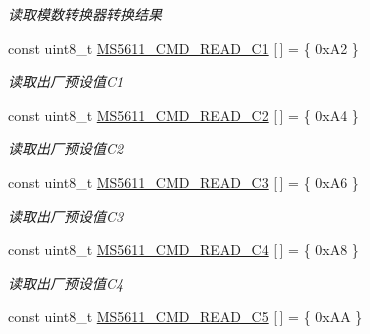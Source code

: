 \begin{DoxyCompactItemize}
\begin{DoxyCompactList}\small\item\em 读取模数转换器转换结果 \end{DoxyCompactList}\item 
const uint8\+\_\+t \hyperlink{group__ms5611__driver__internal_ga6555aca305c73b423aec8ad7ff75e063}{M\+S5611\+\_\+\+C\+M\+D\+\_\+\+R\+E\+A\+D\+\_\+\+C1} \mbox{[}$\,$\mbox{]} = \{ 0x\+A2 \}\hypertarget{group__ms5611__driver__internal_ga6555aca305c73b423aec8ad7ff75e063}{}\label{group__ms5611__driver__internal_ga6555aca305c73b423aec8ad7ff75e063}

\begin{DoxyCompactList}\small\item\em 读取出厂预设值\+C1 \end{DoxyCompactList}\item 
const uint8\+\_\+t \hyperlink{group__ms5611__driver__internal_ga433d78a7f1e4e7c6bea1d15c551f6273}{M\+S5611\+\_\+\+C\+M\+D\+\_\+\+R\+E\+A\+D\+\_\+\+C2} \mbox{[}$\,$\mbox{]} = \{ 0x\+A4 \}\hypertarget{group__ms5611__driver__internal_ga433d78a7f1e4e7c6bea1d15c551f6273}{}\label{group__ms5611__driver__internal_ga433d78a7f1e4e7c6bea1d15c551f6273}

\begin{DoxyCompactList}\small\item\em 读取出厂预设值\+C2 \end{DoxyCompactList}\item 
const uint8\+\_\+t \hyperlink{group__ms5611__driver__internal_ga2fffdcd4e827763dc9344b49a1833f69}{M\+S5611\+\_\+\+C\+M\+D\+\_\+\+R\+E\+A\+D\+\_\+\+C3} \mbox{[}$\,$\mbox{]} = \{ 0x\+A6 \}\hypertarget{group__ms5611__driver__internal_ga2fffdcd4e827763dc9344b49a1833f69}{}\label{group__ms5611__driver__internal_ga2fffdcd4e827763dc9344b49a1833f69}

\begin{DoxyCompactList}\small\item\em 读取出厂预设值\+C3 \end{DoxyCompactList}\item 
const uint8\+\_\+t \hyperlink{group__ms5611__driver__internal_ga90b99ee2918d8d5163654e78ab25738c}{M\+S5611\+\_\+\+C\+M\+D\+\_\+\+R\+E\+A\+D\+\_\+\+C4} \mbox{[}$\,$\mbox{]} = \{ 0x\+A8 \}\hypertarget{group__ms5611__driver__internal_ga90b99ee2918d8d5163654e78ab25738c}{}\label{group__ms5611__driver__internal_ga90b99ee2918d8d5163654e78ab25738c}

\begin{DoxyCompactList}\small\item\em 读取出厂预设值\+C4 \end{DoxyCompactList}\item 
const uint8\+\_\+t \hyperlink{group__ms5611__driver__internal_gafd13f5a06daa45df48f2c61a2f747fb3}{M\+S5611\+\_\+\+C\+M\+D\+\_\+\+R\+E\+A\+D\+\_\+\+C5} \mbox{[}$\,$\mbox{]} = \{ 0x\+A\+A \}\hypertarget{group__ms5611__driver__internal_gafd13f5a06daa45df48f2c61a2f747fb3}{}\label{group__ms5611__driver__internal_gafd13f5a06daa45df48f2c61a2f747fb3}


\end{DoxyCompactItemize}
